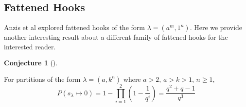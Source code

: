 \documentclass[numbers=enddot,12pt,final,onecolumn,notitlepage]{scrartcl}%
\theoremstyle{definition}
\newtheorem{conj}[theo]{Conjecture}
\newenvironment{conjecture}[1][]
{\begin{conj}[#1]\begin{leftbar}}
{\end{leftbar}\end{conj}}
\let\prodnonlimits\prod
\renewcommand{\prod}{\prodnonlimits\limits}
\renewcommand{\geq}{\geqslant}
\theoremstyle{plainsl}
\begin{document}
\subsection{Fattened Hooks}
Anzis et al \cite{Anzis18} explored fattened hooks of the form $\lambda = (a^m,1^n)$. Here we provide another interesting result about a different family of fattened hooks for the interested reader. 

\begin{conjecture}
For partitions of the form $\lambda = (a, k^n)$ where $a>2$, $a>k>1$, $n\geq1$,
\[
P(s_{\lambda} \longmapsto 0) = 1-\prod_{i=1}^{2} \left(  1-\dfrac{1}{q^{i}}\right) = \dfrac{q^2+q-1}{q^3}
\]

\end{conjecture}

\printbibliography
\end{document}
